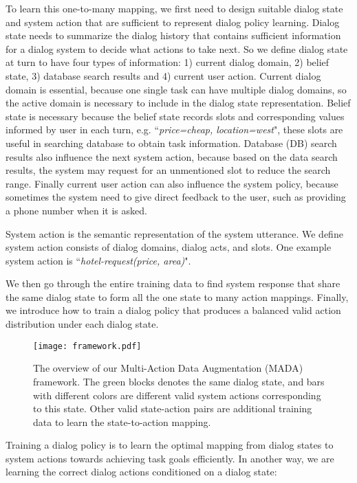 \documentclass[letterpaper]{article} \usepackage{aaai20}  \usepackage{times}  \usepackage{helvet} \usepackage{courier}  \usepackage[hyphens]{url}  \usepackage{graphicx} \urlstyle{rm} \def\UrlFont{\rm}  \usepackage{graphicx}  \frenchspacing  \setlength{\pdfpagewidth}{8.5in}  \setlength{\pdfpageheight}{11in}  \usepackage{multirow}
\begin{document}
	To learn this one-to-many mapping, we first need to design suitable dialog state and system action that are sufficient to represent dialog policy learning. Dialog state needs to summarize the dialog history that contains sufficient information for a dialog system to decide what actions to take next. So we define dialog state  at turn  to have four types of information: 1) current dialog domain, 2) belief state, 3) database search results and 4) current user action. 
	Current dialog domain  is essential, because one single task can have multiple dialog domains, so the active domain is necessary to include in the dialog state representation. Belief state  is necessary because the belief state records slots and corresponding values informed by user in each turn, e.g. ``\textit{price=cheap, location=west}", these slots are useful in searching database to obtain task information. Database (DB) search results  also influence the next system action, because based on the data search results, the system may request for an unmentioned slot to reduce the search range. Finally current user action  can also influence the system policy, because sometimes the system need to give direct feedback to the user, such as providing a phone number when it is asked.
	
	
	System action is the semantic representation of the system utterance. We define system action consists of dialog domains, dialog acts, and slots. One example system action is ``\textit{hotel-request(price, area)}". 
	
	We then go through the entire training data to find system response that share the same dialog state to form all the one state to many action mappings.
	Finally, we introduce how to train a dialog policy that produces a balanced valid action distribution under each dialog state.
	
	\begin{figure}[t!]
		\centering
		\texttt{[image: framework.pdf]} 
		\caption{The overview of our Multi-Action Data Augmentation (MADA) framework. The green blocks denotes the same dialog state, and bars with different colors are different valid system actions corresponding to this state. Other valid state-action pairs are additional training data to learn the state-to-action mapping.}
		\label{framework}
	\end{figure}
	
	Training a dialog policy is to learn the optimal mapping from dialog states to system actions towards achieving task goals efficiently. In another way, we are learning the correct dialog actions conditioned on a dialog state:
	
\end{document}
